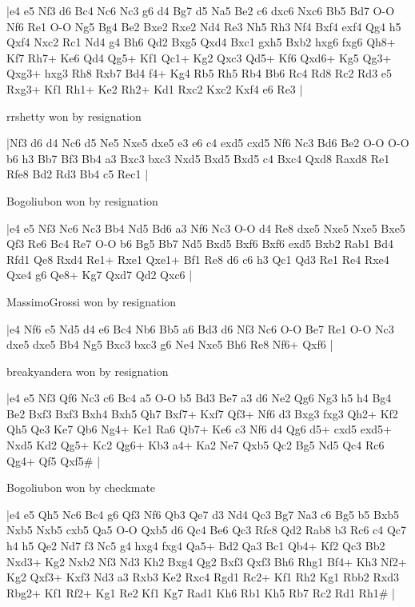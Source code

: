 \makegametitle
|e4 e5 Nf3 d6 Bc4 Nc6 Nc3 g6 d4 Bg7 d5 Na5 Be2 c6 dxc6 Nxc6 Bb5 Bd7 O-O Nf6 Re1 O-O Ng5 Bg4 Be2 Bxe2 Rxe2 Nd4 Re3 Nh5 Rh3 Nf4 Bxf4 exf4 Qg4 h5 Qxf4 Nxc2 Rc1 Nd4 g4 Bh6 Qd2 Bxg5 Qxd4 Bxc1 gxh5 Bxb2 hxg6 fxg6 Qh8+ Kf7 Rh7+ Ke6 Qd4 Qg5+ Kf1 Qc1+ Kg2 Qxc3 Qd5+ Kf6 Qxd6+ Kg5 Qg3+ Qxg3+ hxg3 Rh8 Rxb7 Bd4 f4+ Kg4 Rb5 Rh5 Rb4 Bb6 Rc4 Rd8 Rc2 Rd3 e5 Rxg3+ Kf1 Rh1+ Ke2 Rh2+ Kd1 Rxc2 Kxc2 Kxf4 e6 Re3  |

\showboard

rrshetty won by resignation

\makegametitle
|Nf3 d6 d4 Nc6 d5 Ne5 Nxe5 dxe5 e3 e6 c4 exd5 cxd5 Nf6 Nc3 Bd6 Be2 O-O O-O b6 h3 Bb7 Bf3 Bb4 a3 Bxc3 bxc3 Nxd5 Bxd5 Bxd5 c4 Bxc4 Qxd8 Raxd8 Re1 Rfe8 Bd2 Rd3 Bb4 c5 Rec1  |

\showboard

Bogoliubon won by resignation

\makegametitle
|e4 e5 Nf3 Nc6 Nc3 Bb4 Nd5 Bd6 a3 Nf6 Nc3 O-O d4 Re8 dxe5 Nxe5 Nxe5 Bxe5 Qf3 Re6 Bc4 Re7 O-O b6 Bg5 Bb7 Nd5 Bxd5 Bxf6 Bxf6 exd5 Bxb2 Rab1 Bd4 Rfd1 Qe8 Rxd4 Re1+ Rxe1 Qxe1+ Bf1 Re8 d6 c6 h3 Qc1 Qd3 Re1 Re4 Rxe4 Qxe4 g6 Qe8+ Kg7 Qxd7 Qd2 Qxc6  |

\showboard

MassimoGrossi won by resignation

\makegametitle
|e4 Nf6 e5 Nd5 d4 e6 Bc4 Nb6 Bb5 a6 Bd3 d6 Nf3 Nc6 O-O Be7 Re1 O-O Nc3 dxe5 dxe5 Bb4 Ng5 Bxc3 bxc3 g6 Ne4 Nxe5 Bh6 Re8 Nf6+ Qxf6  |

\showboard

breakyandera won by resignation

\makegametitle
|e4 e5 Nf3 Qf6 Nc3 c6 Bc4 a5 O-O b5 Bd3 Be7 a3 d6 Ne2 Qg6 Ng3 h5 h4 Bg4 Be2 Bxf3 Bxf3 Bxh4 Bxh5 Qh7 Bxf7+ Kxf7 Qf3+ Nf6 d3 Bxg3 fxg3 Qh2+ Kf2 Qh5 Qe3 Ke7 Qb6 Ng4+ Ke1 Ra6 Qb7+ Ke6 c3 Nf6 d4 Qg6 d5+ cxd5 exd5+ Nxd5 Kd2 Qg5+ Kc2 Qg6+ Kb3 a4+ Ka2 Ne7 Qxb5 Qc2 Bg5 Nd5 Qc4 Rc6 Qg4+ Qf5 Qxf5\#  |

\showboard

Bogoliubon won by checkmate

\makegametitle
|e4 e5 Qh5 Nc6 Bc4 g6 Qf3 Nf6 Qb3 Qe7 d3 Nd4 Qc3 Bg7 Na3 c6 Bg5 b5 Bxb5 Nxb5 Nxb5 cxb5 Qa5 O-O Qxb5 d6 Qc4 Be6 Qc3 Rfc8 Qd2 Rab8 b3 Rc6 c4 Qc7 h4 h5 Qe2 Nd7 f3 Nc5 g4 hxg4 fxg4 Qa5+ Bd2 Qa3 Bc1 Qb4+ Kf2 Qc3 Bb2 Nxd3+ Kg2 Nxb2 Nf3 Nd3 Kh2 Bxg4 Qg2 Bxf3 Qxf3 Bh6 Rhg1 Bf4+ Kh3 Nf2+ Kg2 Qxf3+ Kxf3 Nd3 a3 Rxb3 Ke2 Rxc4 Rgd1 Rc2+ Kf1 Rh2 Kg1 Rbb2 Rxd3 Rbg2+ Kf1 Rf2+ Kg1 Re2 Kf1 Kg7 Rad1 Kh6 Rb1 Kh5 Rb7 Rc2 Rd1 Rh1\#  |

